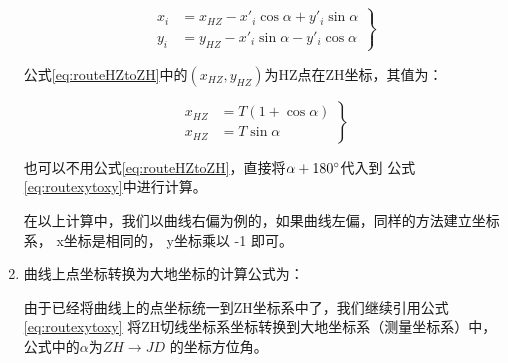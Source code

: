 \begin{enumerate}
\begin{equation}
\left . \begin{aligned}
x_i &= x_{HZ} - x'_i  \cos \alpha + y'_i \sin \alpha \\
y_i &= y_{HZ}  -  x'_i \sin \alpha -  y'_i \cos \alpha 
\end{aligned} \right \}
\label{eq:routeHZtoZH}
\end{equation}

公式\ref{eq:routeHZtoZH}中的$(x_{HZ}, y_{HZ})$为HZ点在ZH坐标，其值为：

\begin{equation}
\left . \begin{aligned}
x_{HZ} &= T (1 +  \cos \alpha) \\
x_{HZ} &=  T \sin \alpha 
\end{aligned} \right \}
\label{eq:routeHZXY}
\end{equation}

也可以不用公式\ref{eq:routeHZtoZH}，直接将$\alpha+180^\circ$代入到
公式\ref{eq:routexytoxy}中进行计算。

在以上计算中，我们以曲线右偏为例的，如果曲线左偏，同样的方法建立坐标系，
x坐标是相同的， y坐标乘以 -1 即可。

\item 曲线上点坐标转换为大地坐标的计算公式为：

由于已经将曲线上的点坐标统一到ZH坐标系中了，我们继续引用公式\ref{eq:routexytoxy}
将ZH切线坐标系坐标转换到大地坐标系（测量坐标系）中，公式中的$\alpha$为$ZH \rightarrow JD$
的坐标方位角。

\end{enumerate}